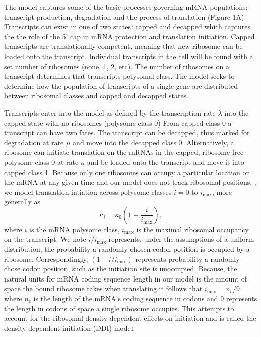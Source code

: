 \documentclass[review]{elsarticle}
\newcommand{\imax}{\ensuremath{{i_{\max}}}\xspace}
\begin{document}
The model captures some of the basic processes governing mRNA populations: transcript production, degradation and the process of translation (Figure 1A).
Transcripts can exist in one of two states: capped and decapped which captures the the role of the 5' cap in mRNA protection and translation initiation. 
Capped transcripts are translationally competent, meaning that new ribosome can be loaded onto the transcript. 
Individual transcripts in the cell will be found with a set number of ribosomes (none, 1, 2, etc).
The number of ribosomes on a transcript determines that transcripts polysomal class.
The model seeks to determine how the population of transcripts of a single gene are distributed between ribosomal classes and capped and decapped states.

Transcripts enter into the model as defined by the transcription rate $\lambda$ into the capped state with no ribosomes (polysome class 0)
From capped class 0 a transcript can have two fates. 
The transcript can be decapped, thus marked for degradation at rate $\mu$ and move into the decapped class 0.
Alternatively, a ribosome can initiate translation on the mRNAs in the capped, ribosome free polysome class 0 at rate $\kappa$ and be loaded onto the transcript and move it into capped class 1.
Because only one ribosomes can occupy a particular location on the mRNA at any given time and our model does not track ribosomal positions,
, we model translation intiation across polysome classes $i = 0$ to $\imax$, more generally as
\begin{equation}
  \label{eq:kappa_i}
  \kappa_i = \kappa_0 \left(1- \frac{i}{\imax}\right),
\end{equation}
where $i$ is the mRNA polysome class, \imax is the maximal ribosomal occupancy on the transcript.
We note $i/\imax$ represents, under the assumptions of a uniform distribution,  the probability a randomly chosen codon position is occupied by a ribosome.
Correspondingly, $(1 - i/\imax)$ represents probability a randomly chose codon position, such as the initiation site is unoccupied.
Because, the natural units for mRNA coding sequence length in our model is the amount of space the bound ribosome takes when translating it follows that $\imax = n_{c}/9$ where $n_{c}$ is the length of the mRNA's coding sequence in codons and 9 represents the length in codons of space a single ribosome occupies.
This attempts to account for the ribosomal density dependent effects on initiation and is called the density dependent initiation (DDI) model.
\end{document}
